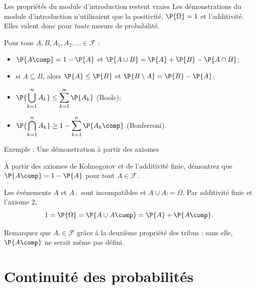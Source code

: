 \documentclass[nuit,charter,pied]{BeamerJS}
\newcommand{\tribu}{\mathcal{F}}
\begin{document}
\begin{frame}[t]{Les propriétés du module d'introduction restent vraies}
\pause
	Les démonstrations du module d'introduction n'utilisaient que la positivité, \(\P{\Omega}=1\) et l'additivité. \pause Elles valent donc pour \emph{toute} mesure de probabilité.
	\pause
	\begin{props}
		Pour tous \(A,B,A_1,A_2,\ldots\in\tribu\) :
		\begin{itemize}
			\item \(\P{A\comp}=1-\P{A}\) et \(\P{A\cup B}=\P{A}+\P{B}-\P{A\cap B}\);\pause
			\item si \(A\subseteq B\), alors \(\P{A}\leq\P{B}\) et \(\P{B\setminus A}=\P{B}-\P{A}\);\pause
			\item \(\displaystyle\P{\bigcup_{k=1}^{\infty}A_k}\leq\sum_{k=1}^{\infty}\P{A_k}\) \hfill (Boole);\pause
			\item \(\displaystyle\P{\bigcap_{k=1}^{n}A_k}\geq 1-\sum_{k=1}^{n}\P{A_k\comp}\) \hfill (Bonferroni).
		\end{itemize}
	\end{props}
\end{frame}

\begin{frame}{Exemple : Une démonstration à partir des axiomes}
	\begin{cadre}
		À partir des axiomes de Kolmogorov et de l'additivité finie, démontrez que \(\P{A\comp}=1-\P{A}\) pour tout \(A\in\tribu\).
	\end{cadre}
	\pause
	Les événements \(A\) et \(A\comp\) sont incompatibles et \(A\cup A\comp=\Omega\). \pause Par additivité finie et l'axiome 2,
	\[1=\P{\Omega}=\P{A\cup A\comp}=\P{A}+\P{A\comp}.\]
	\pause
	\begin{lumiere}
		Remarquez que \(A\comp\in\tribu\) grâce à la deuxième propriété des tribus : sans elle, \(\P{A\comp}\) ne serait même pas défini.
	\end{lumiere}
\end{frame}

\section{Continuité des probabilités}
\end{document}
